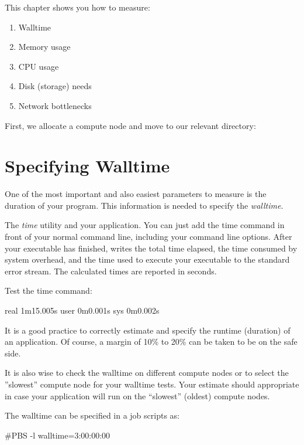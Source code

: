 This chapter shows you how to measure:

\begin{enumerate}
\item  Walltime
\item  Memory usage
\item  CPU usage
\item  Disk (storage) needs
\item  Network bottlenecks
\end{enumerate}

First, we allocate a compute node and move to our relevant directory:
\begin{prompt}
\end{prompt}

\section{Specifying Walltime}

One of the most important and also easiest parameters to measure is the
duration of your program. This information is needed to specify the
\emph{walltime}.

The \emph{time} utility  and  your application.
You can just add the time command in front of your normal command line,
including your command line options. After your executable has finished,
 writes the total time elapsed, the time consumed by system
overhead, and the time used to execute your executable to the standard error
stream. The calculated times are reported in seconds.


Test the time command:
\begin{prompt}
real 1m15.005s
user 0m0.001s
sys 0m0.002s
\end{prompt}

It is a good practice to correctly estimate and specify the runtime (duration)
of an application. Of course, a margin of 10\% to 20\% can be taken to be on
the safe side.

It is also wise to check the walltime on different compute nodes or to select
the ''slowest'' compute node for your walltime tests. Your estimate should
appropriate in case your application will run on the ``slowest'' (oldest)
compute nodes.

The walltime can be specified in a job scripts as:
\begin{prompt}
#PBS -l walltime=3:00:00:00
\end{prompt}


